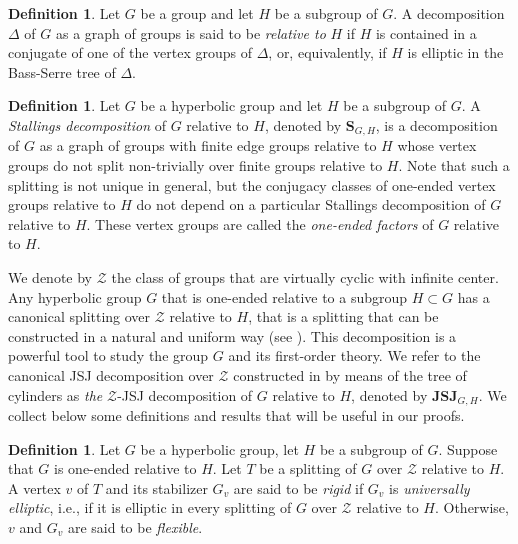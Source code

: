 \documentclass[a4paper, 11pt]{amsart}
\theoremstyle{definition}
\newtheorem{de}[te]{Definition}
\theoremstyle{remark}
\begin{document}
\begin{de}
Let $G$ be a group and let $H$ be a subgroup of $G$. A decomposition $\Delta$ of $G$ as a graph of groups is said to be \emph{relative to} $H$ if $H$ is contained in a conjugate of one of the vertex groups of $\Delta$, or, equivalently, if $H$ is elliptic in the Bass-Serre tree of $\Delta$.
\end{de}

\begin{de}\label{Stallings}
Let $G$ be a hyperbolic group and let $H$ be a subgroup of $G$. A \emph{Stallings decomposition} of $G$ relative to $H$, denoted by $\mathbf{S}_{G,H}$, is a decomposition of $G$ as a graph of groups with finite edge groups relative to $H$ whose vertex groups do not split non-trivially over finite groups relative to $H$. Note that such a splitting is not unique in general, but the conjugacy classes of one-ended vertex groups relative to $H$ do not depend on a particular Stallings decomposition of $G$ relative to $H$. These vertex groups are called the \emph{one-ended factors} of $G$ relative to $H$.
\end{de}

We denote by $\mathcal{Z}$ the class of groups that are virtually cyclic with infinite center. Any hyperbolic group $G$ that is one-ended relative to a subgroup $H\subset G$ has a canonical splitting over $\mathcal{Z}$ relative to $H$, that is a splitting that can be constructed in a natural and uniform way (see \cite{Sel97, Bow98, GL16}). This decomposition is a powerful tool to study the group $G$ and its first-order theory. We refer to the canonical JSJ decomposition over $\mathcal{Z}$ constructed in \cite{GL16} by means of the tree of cylinders as \emph{the} $\mathcal{Z}$-JSJ decomposition of $G$ relative to $H$, denoted by $\mathbf{JSJ}_{G,H}$. We collect below some definitions and results that will be useful in our proofs.


\begin{de}\label{def_rig_vert} Let $G$ be a hyperbolic group, let $H$ be a subgroup of $G$. Suppose that $G$ is one-ended relative to $H$. Let $T$ be a splitting of $G$ over $\mathcal{Z}$ relative to $H$. A vertex $v$ of $T$ and its stabilizer $G_v$ are said to be \emph{rigid} if $G_v$ is \emph{universally elliptic}, i.e., if it is elliptic in every splitting of $G$ over $\mathcal{Z}$ relative to $H$. Otherwise, $v$ and $G_v$ are said to be \emph{flexible}.\end{de}
\end{document}
